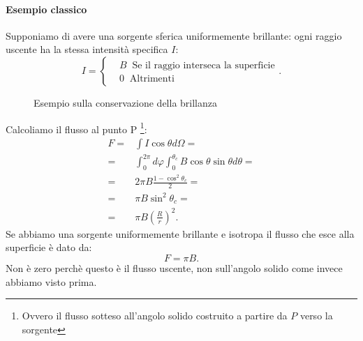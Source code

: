 \paragraph{Esempio classico}%
Supponiamo di avere una sorgente sferica uniformemente brillante: ogni raggio uscente ha la stessa intensità specifica $I$:
 \[
	I = \begin{cases}
		&B  \ \text{ Se il raggio interseca la superficie}\\
		&0 \ \text{ Altrimenti}
	\end{cases}
.\] 
\begin{figure}[H]
    \centering
    \caption{Esempio sulla conservazione della brillanza}
    \label{fig:esempio-su-conservazione-della-brillanza}
\end{figure}
\noindent
Calcoliamo il flusso al punto P \footnote{Ovvero il flusso sotteso all'angolo solido costruito a partire da $P$ verso la sorgente}:
\begin{align}
	F =& \int I\cos\theta d\Omega=\\
	  =&\int_{0}^{2\pi}d\varphi \int_{0}^{\theta_{c}}B \cos\theta\sin\theta d\theta =\\
	  =&2\pi B\frac{1-\cos^2\theta_{c}}{2}=\\
	  =&\pi B \sin^2\theta_{c}=\\
	  =&\pi B \left( \frac{R}{r} \right) ^2
.\end{align}
Se abbiamo una sorgente uniformemente brillante e isotropa il flusso che esce alla superficie è dato da:
\[
	F = \pi B
.\] 
Non è zero perchè questo è il flusso uscente, non sull'angolo solido come invece abbiamo visto prima.\\
